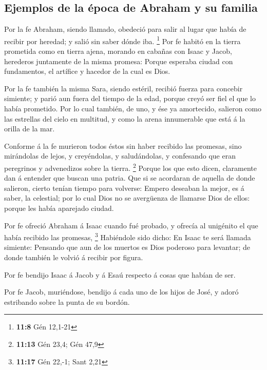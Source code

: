\hypertarget{ejemplos-de-la-uxe9poca-de-abraham-y-su-familia}{%
\subsection{Ejemplos de la época de Abraham y su
familia}\label{ejemplos-de-la-uxe9poca-de-abraham-y-su-familia}}

 Por la fe Abraham, siendo llamado, obedeció para salir al
lugar que había de recibir por heredad; y salió sin saber dónde iba.
\footnote{\textbf{11:8} Gén 12,1-21}  Por fe habitó en la
tierra prometida como en tierra ajena, morando en cabañas con Isaac y
Jacob, herederos juntamente de la misma promesa:  Porque
esperaba ciudad con fundamentos, el artífice y hacedor de la cual es
Dios.

 Por la fe también la misma Sara, siendo estéril, recibió
fuerza para concebir simiente; y parió aun fuera del tiempo de la edad,
porque creyó ser fiel el que lo había prometido.  Por lo
cual también, de uno, y ése ya amortecido, salieron como las estrellas
del cielo en multitud, y como la arena innumerable que está á la orilla
de la mar.

 Conforme á la fe murieron todos éstos sin haber recibido
las promesas, sino mirándolas de lejos, y creyéndolas, y saludándolas, y
confesando que eran peregrinos y advenedizos sobre la tierra.
\footnote{\textbf{11:13} Gén 23,4; Gén 47,9}  Porque los
que esto dicen, claramente dan á entender que buscan una patria.
 Que si se acordaran de aquella de donde salieron, cierto
tenían tiempo para volverse:  Empero deseaban la mejor,
es á saber, la celestial; por lo cual Dios no se avergüenza de llamarse
Dios de ellos: porque les había aparejado ciudad.

 Por fe ofreció Abraham á Isaac cuando fué probado, y
ofrecía al unigénito el que había recibido las promesas, \footnote{\textbf{11:17}
  Gén 22,-1; Sant 2,21}  Habiéndole sido dicho: En Isaac
te será llamada simiente:  Pensando que aun de los
muertos es Dios poderoso para levantar; de donde también le volvió á
recibir por figura.

 Por fe bendijo Isaac á Jacob y á Esaú respecto á cosas
que habían de ser.

 Por fe Jacob, muriéndose, bendijo á cada uno de los
hijos de José, y adoró estribando sobre la punta de su bordón.

